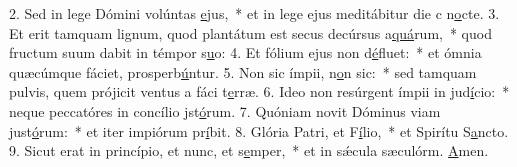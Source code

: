 2. Sed in lege Dómini volúntas \uline{e}jus,~* et in lege ejus meditábitur die c n\uline{o}cte.
3. Et erit tamquam lignum, quod plantátum est secus decúrsus a\uline{quá}rum,~* quod fructum suum dabit in témpor s\uline{u}o:
4. Et fólium ejus non d\uline{é}fluet:~* et ómnia quæcúmque fáciet, prosperb\uline{ú}ntur.
5. Non sic ímpii, n\uline{o}n sic:~* sed tamquam pulvis, quem prójicit ventus a fáci t\uline{e}rræ.
6. Ideo non resúrgent ímpii in jud\uline{í}cio:~* neque peccatóres in concílio jst\uline{ó}rum.
7. Quóniam novit Dóminus viam just\uline{ó}rum:~* et iter impiórum pr\uline{í}bit.
8. Glória Patri, et F\uline{í}lio,~* et Spirítu S\uline{a}ncto.
9. Sicut erat in princípio, et nunc, et s\uline{e}mper,~* et in sǽcula sæculórm. \uline{A}men.
